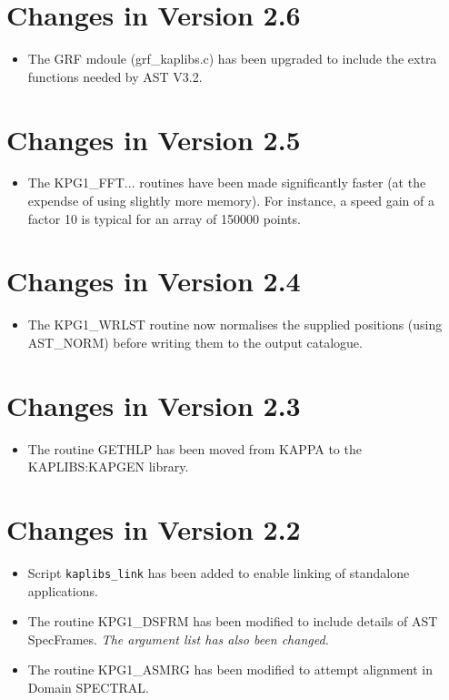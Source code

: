 \section{Changes in Version 2.6}
\begin{itemize}
\item The GRF mdoule (grf\_kaplibs.c) has been upgraded to include the
extra functions needed by AST V3.2.
\end{itemize}

\section{Changes in Version 2.5}
\begin{itemize}
\item The KPG1\_FFT... routines have been made significantly faster (at
the expendse of using slightly more memory). For instance, a speed gain
of a factor 10 is typical for an array of 150000 points.
\end{itemize}

\section{Changes in Version 2.4}
\begin{itemize}
\item The KPG1\_WRLST routine now normalises the supplied positions (using
AST\_NORM) before writing them to the output catalogue.
\end{itemize}

\section{Changes in Version 2.3}
\begin{itemize}
\item The routine GETHLP has been moved from KAPPA to the KAPLIBS:KAPGEN library.
\end{itemize}

\section{Changes in Version 2.2}
\begin{itemize}
\item Script \verb+kaplibs_link+ has been added to enable linking of standalone 
applications.
\item The routine KPG1\_DSFRM has been modified to include details of AST 
SpecFrames. \emph{The argument list has also been changed.}
\item The routine KPG1\_ASMRG has been modified to attempt alignment in 
Domain SPECTRAL.
\end{itemize}

